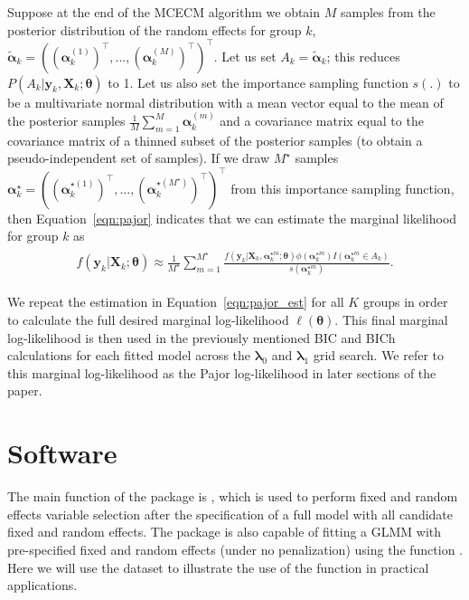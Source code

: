 Suppose at the end of the MCECM algorithm we obtain \(M\) samples from
the posterior distribution of the random effects for group \(k\),
\(\boldsymbol{\tilde \alpha}_k= ((\boldsymbol \alpha_k^{(1)})^\top,...,(\boldsymbol \alpha_k^{(M)})^\top)^\top\).
Let us set \(A_k = \boldsymbol{\tilde \alpha}_k\); this reduces
\(P(A_k | \boldsymbol y_k, \boldsymbol X_k; \boldsymbol \theta)\) to 1.
Let us also set the importance sampling function \(s(.)\) to be a
multivariate normal distribution with a mean vector equal to the mean of
the posterior samples
\(\frac{1}{M}\sum_{m=1}^M \boldsymbol \alpha_k^{(m)}\) and a covariance
matrix equal to the covariance matrix of a thinned subset of the
posterior samples (to obtain a pseudo-independent set of samples). If we draw \(M^\star\) samples
\(\boldsymbol\alpha_k^\star= ((\boldsymbol \alpha_k^{\star(1)})^\top,...,(\boldsymbol \alpha_k^{\star(M^\star)})^\top)^\top\)
from this importance sampling function, then Equation~\ref{eqn:pajor}
indicates that we can estimate the marginal likelihood for group \(k\)
as \begin{align}
\begin{aligned}
  f(\boldsymbol y_k | \boldsymbol X_k; \boldsymbol\theta) \approx \frac{1}{M^\star} \sum_{m=1}^{M^\star} 
  \frac{f(\boldsymbol y_k | \boldsymbol X_k, \boldsymbol\alpha_k^{\star m}; \boldsymbol\theta) \phi(\boldsymbol\alpha_k^{\star m}) I(\boldsymbol\alpha_k^{\star m} \in A_k)}{s(\boldsymbol\alpha_k^{\star m})}.
  \label{eqn:pajor_est}
\end{aligned}
\end{align}

We repeat the estimation in Equation~\ref{eqn:pajor_est} for all \(K\) groups in order to calculate the full desired marginal log-likelihood \(\ell(\boldsymbol \theta)\). This final marginal log-likelihood is then used in the previously mentioned BIC and BICh calculations for each fitted model across the \(\boldsymbol \lambda_0\) and \(\boldsymbol \lambda_1\) grid search. We refer to this marginal log-likelihood as the Pajor log-likelihood in later sections of the paper.

\section{Software}
\label{sec:software}

The main function of the  package is , which is used to perform fixed and random effects variable selection after the specification of a full model with all candidate fixed and random effects. The  package is also capable of fitting a GLMM with pre-specified fixed and random effects (under no penalization) using the function  . Here we will use the  dataset \citep{rashid2020} to illustrate the use of the  function in practical applications. 

